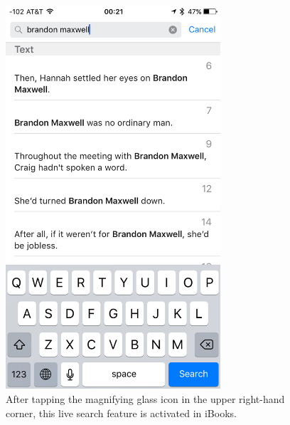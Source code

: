 \documentclass[journal, a4paper]{IEEEtran}
\begin{document}
    \begin{figure}[!hbt]
		\begin{center}
		\includegraphics[width=8cm]{ibooksSearch}
		\caption{After tapping the magnifying glass icon in the upper right-hand corner, this live search feature is activated in iBooks.}
		\label{fig:ibooksSearch}
		\end{center}
	\end{figure}
    
\end{document}
